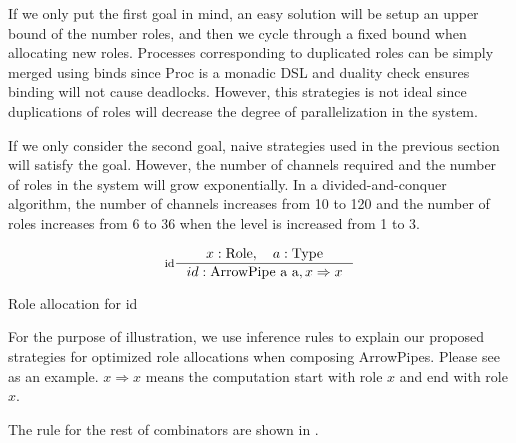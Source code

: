 If we only put the first goal in mind, an easy solution will be setup an upper bound of the number roles, and then we cycle through a fixed bound when allocating new roles. Processes corresponding to duplicated roles can be simply merged using binds since Proc is a monadic DSL and duality check ensures binding will not cause deadlocks. However, this strategies is not ideal since duplications of roles will decrease the degree of parallelization in the system.

If we only consider the second goal, naive strategies used in the previous section will satisfy the goal. However, the number of channels required and the number of roles in the system will grow exponentially. In a divided-and-conquer algorithm, the number of channels increases from 10 to 120 and the number of roles increases from 6 to 36 when the level is increased from 1 to 3.
\begin{listing}[ht]
\begin{displaymath} 
    \inference[id]{x: \text{Role}, \quad a: \text{Type}}{id : \text{ArrowPipe a a}, x \Rightarrow x}
\end{displaymath}
\caption{Role allocation for id}
\label{arrowPipe:ra:example}
\end{listing}

For the purpose of illustration, we use inference rules to explain our proposed strategies for optimized role allocations when composing ArrowPipes. Please see  as an example. $x \Rightarrow x$ means the computation start with role $x$ and end with role $x$.
The rule for the rest of combinators are shown in .  


